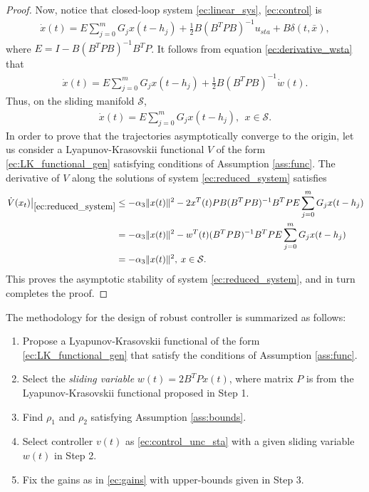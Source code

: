 \documentclass[onecolumn]{IEEEtran}
\newtheorem{proof}{Proof}
\begin{document}
\begin{proof}
Now, notice that closed-loop system \eqref{ec:linear_sys}, \eqref{ec:control}  is 
\begin{equation*}
\begin{split}
\dot x(t)=E\sum_{j=0}^{m} G_j x(t-h_j)+\frac{1}{2}B(B^TPB)^{-1}u_{sta}+B\delta(t,\bar x),
\end{split}
\end{equation*}
where $E=I-B(B^TPB)^{-1}B^TP$. It follows from  equation \eqref{ec:derivative_wsta} that
\begin{equation*}
\begin{split}
\dot x(t)=E\sum_{j=0}^{m} G_j x(t-h_j)+\frac{1}{2}B(B^TPB)^{-1}\dot w(t).
\end{split}
\end{equation*}
Thus, on the sliding manifold $\mathcal{S}$, 
\begin{equation}
\label{ec:reduced_system}
\begin{split}
\dot x(t)=E\sum_{j=0}^{m} G_j x(t-h_j),\:\:x\in \mathcal{S}.
\end{split}
\end{equation}
In order to prove that the trajectories asymptotically converge to the origin, let us consider a Lyapunov-Krasovskii functional $V$ of the form \eqref{ec:LK_functional_gen} satisfying conditions of Assumption \ref{ass:func}.  	The derivative of $V$ along the solutions of system \eqref{ec:reduced_system} satisfies
	\begin{equation*}
	\begin{split}
	\left.\dot V(x_t)\right\rvert_{\eqref{ec:reduced_system}}&\leq -\alpha_3\|x(t)\|^2-2x^T(t)PB(B^TPB)^{-1}B^TPE\sum_{j=0}^{m} G_j x(t-h_j)\\
	&=-\alpha_3\|x(t)\|^2-w^T(t)(B^TPB)^{-1}B^TPE\sum_{j=0}^{m} G_j x(t-h_j)\\
	&=-\alpha_3\|x(t)\|^2,\:x\in \mathcal{S}.
	\end{split}
	\end{equation*}
	This proves the asymptotic stability of system \eqref{ec:reduced_system}, and in turn completes the proof.
\end{proof}

 
The methodology for the design of robust controller   is summarized as follows: 
\begin{enumerate}
\item Propose a Lyapunov-Krasovskii functional of the form \eqref{ec:LK_functional_gen} that  satisfy the conditions of Assumption \ref{ass:func}. 
\item Select the \textit{sliding variable} $w(t)=2B^TPx(t)$, where matrix $P$ is from the Lyapunov-Krasovskii functional proposed in Step 1. 
\item Find $\rho_1$ and $\rho_2$ satisfying Assumption \ref{ass:bounds}.
\item Select controller $v(t)$ as  \eqref{ec:control_unc_sta} with a given sliding variable $w(t)$ in Step 2.
\item Fix the gains as in \eqref{ec:gains}  with upper-bounds given in Step 3.
\end{enumerate}
\end{document}
